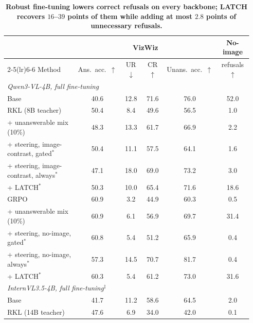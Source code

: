 \begin{table}[t]
\centering
\caption{\textbf{Robust fine-tuning lowers correct refusals on every backbone;
LATCH recovers $16$--$39$ points of them while adding at most $2.8$ points of unnecessary
refusals.} }
\label{tab:refusal}
\small
\begin{tabular}{lccccc}
\toprule
& \multicolumn{4}{c}{VizWiz} & No-image \\
\cmidrule(lr){2-5}\cmidrule(lr){6-6}
Method & Ans.\ acc.\ $\uparrow$ & UR $\downarrow$ & CR $\uparrow$ & Unans.\ acc.\ $\uparrow$
       & refusals $\uparrow$ \\
\midrule
\multicolumn{6}{l}{\textit{Qwen3-VL-4B, full fine-tuning}} \\
Base                                          & 40.6 & 12.8 & 71.6 & 76.0 & 52.0 \\
RKL (8B teacher)                              & 50.4 &  8.4 & 49.6 & 56.5 &  1.0 \\
\quad + unanswerable mix (10\%)               & 48.3 & 13.3 & 61.7 & 66.9 &  2.2 \\
\quad + steering, image-contrast, gated$^\ast$  & 50.4 & 11.1 & 57.5 & 64.1 &  1.6 \\
\quad + steering, image-contrast, always$^\ast$ & 47.1 & 18.0 & 69.0 & 73.2 &  3.0 \\
\quad + LATCH$^\ast$                          & 50.3 & 10.0 & 65.4 & 71.6 & 18.6 \\
GRPO                                          & 60.9 &  3.2 & 44.9 & 60.3 &  0.5 \\
\quad + unanswerable mix (10\%)               & 60.9 &  6.1 & 56.9 & 69.7 & 31.4 \\
\quad + steering, no-image, gated$^\ast$      & 60.8 &  5.4 & 51.2 & 65.9 &  0.4 \\
\quad + steering, no-image, always$^\ast$     & 57.3 & 14.5 & 70.7 & 81.7 &  0.4 \\
\quad + LATCH$^\ast$                          & 60.3 &  5.4 & 61.2 & 73.0 & 31.6 \\
\midrule
\multicolumn{6}{l}{\textit{InternVL3.5-4B, full fine-tuning$^\ddagger$}} \\
Base                                          & 41.7 & 11.2 & 58.6 & 64.5 &  2.0 \\
RKL (14B teacher)                             & 47.6 &  6.9 & 34.0 & 42.0 &  0.1 \\

\end{tabular}
\end{table}
